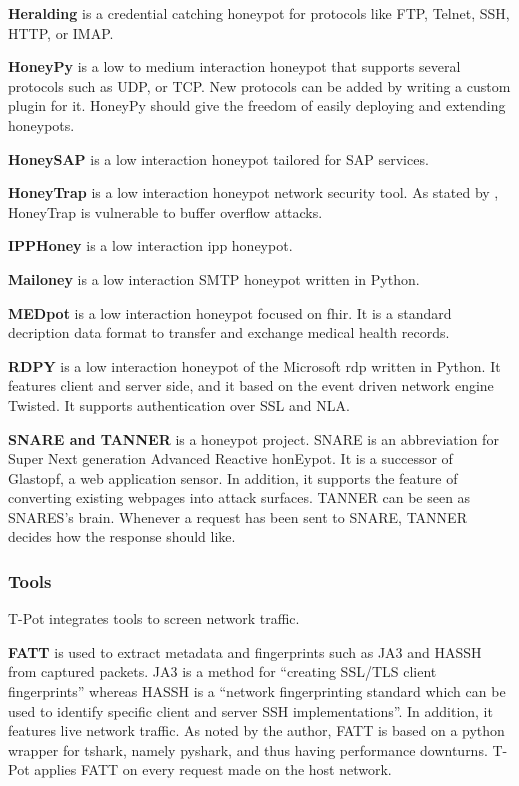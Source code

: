 \textbf{Heralding} \cite{heralding2021} is a credential catching honeypot for protocols like FTP, Telnet, SSH, HTTP, or IMAP.

\textbf{HoneyPy} \cite{honeysap2021} is a low to medium interaction honeypot that supports several protocols such as UDP, or TCP.
New protocols can be added by writing a custom plugin for it.
HoneyPy should give the freedom of easily deploying and extending honeypots.

\textbf{HoneySAP} \cite{honeysap2021} is a low interaction honeypot tailored for SAP services.

\textbf{HoneyTrap} \cite{honeytrap2021} is a low interaction honeypot network security tool.
As stated by \citet*{honeytrap2021}, HoneyTrap is vulnerable to buffer overflow attacks.

\textbf{IPPHoney} \cite{ipphoney2021} is a low interaction \ac{ipp} honeypot.

\textbf{Mailoney} \cite{mailoney2021} is a low interaction SMTP honeypot written in Python.

\textbf{MEDpot} \cite{medpot2021} is a low interaction honeypot focused on \ac{fhir}.
It is a standard decription data format to transfer and exchange medical health records.

\textbf{RDPY} \cite{rdpy2021} is a low interaction honeypot of the Microsoft \ac{rdp} written in Python.
It features client and server side, and it based on the event driven network engine Twisted.
It supports authentication over SSL and NLA.

\textbf{SNARE and TANNER} \cite{snare2021, tanner2021} is a honeypot project.
SNARE is an abbreviation for Super Next generation Advanced Reactive honEypot.
It is a successor of Glastopf, a web application sensor.
In addition, it supports the feature of converting existing webpages into attack surfaces.
TANNER \cite{tanner2021} can be seen as SNARES's brain.
Whenever a request has been sent to SNARE, TANNER decides how the response should like.

\subsubsection{Tools}

T-Pot integrates tools to screen network traffic.

\textbf{FATT} \cite{fatt2021} is used to extract metadata and fingerprints such as JA3 \cite{ja32021} and HASSH \cite{hassh2021} from captured packets.
JA3 is a method for \enquote{creating SSL/TLS client fingerprints} whereas HASSH is a \enquote{network fingerprinting standard which can be used to identify specific client and server SSH implementations}.
In addition, it features live network traffic.
As noted by the author, FATT is based on a python wrapper for tshark, namely pyshark, and thus having performance downturns.
T-Pot applies FATT on every request made on the host network.

